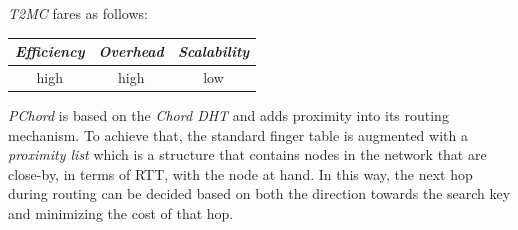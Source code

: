 %
\emph{T2MC} fares as follows:
\begin{center}
\begin{tabular}{ccc}
\emph{Efficiency} & \emph{Overhead} & \emph{Scalability} \\
\hline
high &
high &
low
\end{tabular}
\end{center}

\emph{PChord} \cite{HLYW2005} is based on the \emph{Chord DHT} and adds
proximity into its routing mechanism. To achieve that, the standard finger table
is augmented with a \emph{proximity list} which is a structure that contains
nodes in the network that are close-by, in terms of RTT, with the node at hand.
In this way, the next hop during routing can be decided based on both the
direction towards the search key and minimizing the cost of that hop.

